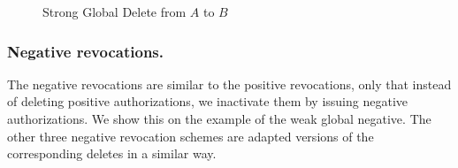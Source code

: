 \documentclass[runningheads]{llncs}
\begin{document}
\vspace{-3mm}
\begin{figure}[H]
\center
{}
\caption{Strong Global Delete from $A$ to $B$}
\end{figure}
\vspace{-7mm}

\subsubsection{Negative revocations.}
The negative revocations are similar to the positive revocations, only that instead of deleting positive authorizations, we inactivate them by issuing negative authorizations. We show this on the example of the weak global negative. The other three negative revocation schemes are adapted versions of the corresponding deletes in a similar way. 
\end{document}

